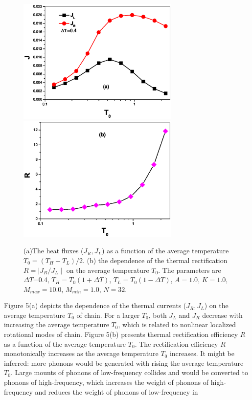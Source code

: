 \documentclass[pra,preprint,superscriptaddress,showkeys,showpacs]{revtex4}
\begin{document}
\begin{figure}
\centering
\includegraphics[width=8cm]{fig5a.eps}
\centering
\includegraphics[width=8cm]{fig5b.eps}
\caption{(a)The heat fluxes ($J_{R},J_{L}$) as a function of the
average temperature $T_{0}=(T_{H}+T_{L})/2$. (b) the dependence of
the thermal rectification $R=\mid J_{R}/J_{L}\mid$ on the average
temperature $T_{0}$. The parameters are $\Delta T$=0.4,
$T_{H}=T_{0}(1+\Delta T)$, $T_{L}=T_{0}(1-\Delta T)$, $A=1.0$,
$K=1.0$, $M_{max}=10.0$, $M_{min}=1.0$, $N=32$.}
\end{figure}
\indent Figure 5(a) depicts the dependence of the thermal currents
($J_{R},J_{L}$) on the average temperature $T_{0}$ of chain. For a
larger $T_{0}$, both $J_{L}$ and $J_{R}$ decrease with increasing
the average temperature $T_{0}$, which is related to nonlinear
localized rotational modes of chain\cite{a27,a28}. Figure 5(b)
presents thermal rectification efficiency $R$ as a function of the
average temperature $T_{0}$. The rectification efficiency $R$
monotonically increases as the average temperature $T_{0}$
increases. It might be inferred: more phonons would be generated
with rising the average temperature $T_{0}$. Large mounts of phonons
of low-frequency collides and would be converted to phonons of
high-frequency, which increases the weight of phonons of
high-frequency and reduces the weight of phonons of low-frequency in
\end{document}
